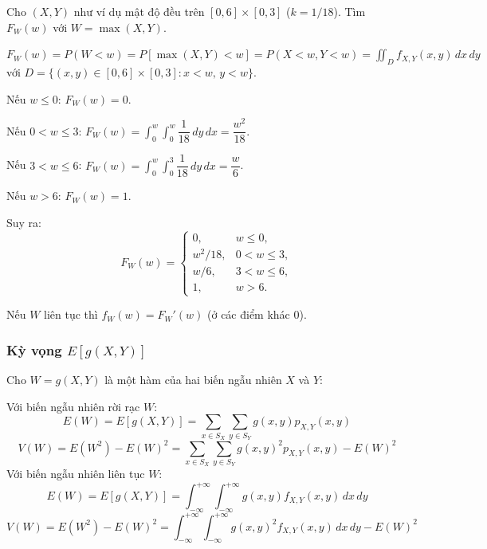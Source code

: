 \documentclass[12pt,a4paper]{article}
\begin{document}
\begin{vidu}[title={$W = \max(X,Y)$ trên hình chữ nhật}]
Cho $(X,Y)$ như ví dụ mật độ đều trên $[0,6]\times[0,3]$ ($k = 1/18$). Tìm $F_W(w)$ với $W = \max(X, Y)$.

$F_W(w) = P(W < w) = P[\max(X, Y) < w] = P(X < w, Y < w) = \displaystyle\iint_D f_{X,Y}(x, y)\,dx\,dy$ với $D = \{(x, y) \in [0,6]\times[0,3] : x < w,\, y < w\}$.

Nếu $w \le 0$: $F_W(w) = 0$.

Nếu $0 < w \le 3$: $F_W(w) = \displaystyle\int_{0}^{w} \int_{0}^{w} \dfrac{1}{18}\,dy\,dx = \dfrac{w^2}{18}$.

Nếu $3 < w \le 6$: $F_W(w) = \displaystyle\int_{0}^{w} \int_{0}^{3} \dfrac{1}{18}\,dy\,dx = \dfrac{w}{6}$.

Nếu $w > 6$: $F_W(w) = 1$.

Suy ra:
\[
  F_W(w) = \begin{cases}
    0, & w \le 0, \\
    w^2/18, & 0 < w \le 3, \\
    w/6, & 3 < w \le 6, \\
    1, & w > 6.
  \end{cases}
\]
\end{vidu}

\begin{luuy}
Nếu $W$ liên tục thì $f_W(w) = F_W'(w)$ (ở các điểm khác 0).
\end{luuy}

\subsubsection{Kỳ vọng $E[g(X,Y)]$}

\begin{dinhly}
Cho $W = g(X, Y )$ là một hàm của hai biến ngẫu nhiên $X$ và $Y$:

Với biến ngẫu nhiên rời rạc $W$:
\[
  E(W) = E[g(X, Y )] = \displaystyle\sum_{x \in S_X} \displaystyle\sum_{y \in S_Y} g(x, y)p_{X,Y}(x, y)
\]
\[
  V(W) = E(W^2) - E(W)^2 = \displaystyle\sum_{x \in S_X} \displaystyle\sum_{y \in S_Y} g(x, y)^2 p_{X,Y}(x, y) - E(W)^2
\]
Với biến ngẫu nhiên liên tục $W$:
\[
  E(W) = E[g(X, Y )] = \displaystyle\int_{-\infty}^{+\infty} \displaystyle\int_{-\infty}^{+\infty} g(x, y)f_{X,Y}(x, y)\,dx\,dy
\]
\[
  V(W) = E(W^2) - E(W)^2 = \displaystyle\int_{-\infty}^{+\infty} \displaystyle\int_{-\infty}^{+\infty} g(x, y)^2 f_{X,Y}(x, y)\,dx\,dy - E(W)^2
\]
\end{dinhly}
\end{document}
